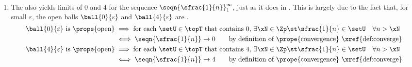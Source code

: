 \begin{example}
\begin{enumerate}
  \item The  also 
        yields limits of $0$ and $4$ for the sequence $\seqn{\sfrac{1}{n}}_1^\infty$, just 
        as it does in .
        This is largely due to the fact that, for small $\varepsilon$, 
        the open balls $\ball{0}{\varepsilon}$ and $\ball{4}{\varepsilon}$ are .
    \begin{align*}
        \text{$\ball{0}{\varepsilon}$ is \prope{open}}
          &\implies \text{for each $\setU\in\topT$ that contains $0$, $\exists\xN\in\Zp \st \sfrac{1}{n}\in\setU\quad\forall n>\xN$}
        \\&\iff \seqn{\sfrac{1}{n}}\to0
          \qquad\text{by definition of \prope{convergence} \xref{def:converge}}
        \\
        \text{$\ball{4}{\varepsilon}$ is \prope{open}}
          &\implies \text{for each $\setU\in\topT$ that contains $4$, $\exists\xN\in\Zp \st \sfrac{1}{n}\in\setU\quad\forall n>\xN$}
        \\&\iff \seqn{\sfrac{1}{n}}\to4
          \qquad\text{by definition of \prope{convergence} \xref{def:converge}}
    \end{align*}  


\end{enumerate}
\end{example}
